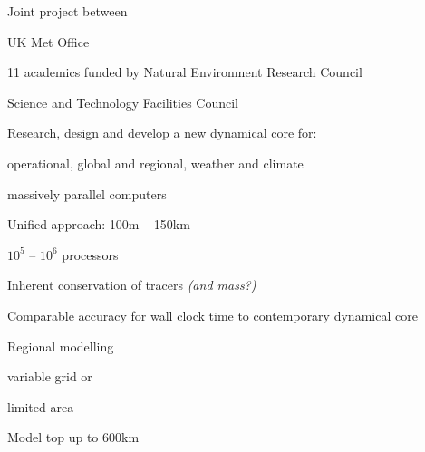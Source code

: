 \begin{slide}

\begin{list0}

\item Joint project between
    \begin{list1}
    \item UK Met Office
    \item 11 academics funded by Natural Environment Research Council
    \item Science and Technology Facilities Council\pauseHS
    \end{list1}

\item Research, design and develop a new dynamical core for:
    \begin{list1}
    \item operational, global and regional, weather and climate
    \item massively parallel computers\pauseHS
    \end{list1}
\end{list0}


\begin{list0}
\item Unified approach: 100m -- 150km
\item $10^5$ -- $10^6$ processors
\item Inherent conservation of tracers {\color{purple}\it (and mass?)}
\item Comparable accuracy for wall clock time to contemporary dynamical core
\item Regional modelling \hspace{1ex} \begin{minipage}[t]{0.5\linewidth}
    \begin{list1}
    \item variable grid or
    \item limited area
    \end{list1}\end{minipage}
\item Model top up to 600km
\end{list0}

\end{slide}

